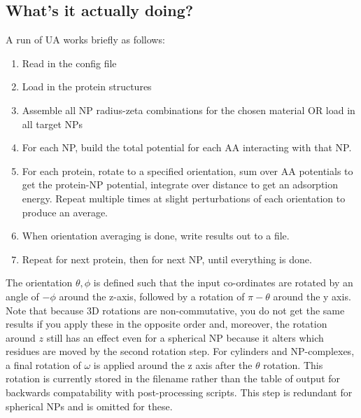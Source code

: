 \documentclass[10pt,a4paper,onecolumn]{report}
\begin{document}
\subsection{What's it actually doing?}
A run of UA works briefly as follows:

\begin{enumerate}
\item Read in the config file
\item Load in the protein structures
\item Assemble all NP radius-zeta combinations for the chosen material OR load in all target NPs
\item For each NP, build the total potential for each AA interacting with that NP.
\item For each protein, rotate to a specified orientation, sum over AA potentials to get the protein-NP potential, integrate over distance to get an adsorption energy. Repeat multiple times at slight perturbations of each orientation to produce an average.
\item When orientation averaging is done, write results out to a file.
\item Repeat for next protein, then for next NP, until everything is done.

\end{enumerate}

 The orientation $\theta,\phi$ is defined such that the input co-ordinates are rotated by an angle of $-\phi$ around the z-axis, followed by a rotation of $\pi - \theta$ around the y axis. Note that because 3D rotations are non-commutative, you do not get the same results if you apply these in the opposite order and, moreover, the rotation around $z$ still has an effect even for a spherical NP because it alters which residues are moved by the second rotation step.  For cylinders and NP-complexes, a final rotation of $\omega$ is applied around the z axis after the $\theta$ rotation. This rotation is currently stored in the filename rather than the table of output for backwards compatability with post-processing scripts. This step is redundant for spherical NPs and is omitted for these. 
\end{document}
